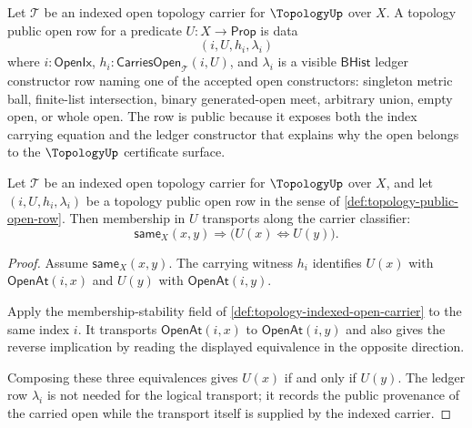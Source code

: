 \begin{definition}
\label{def:topology-public-open-row}
Let $\mathcal{T}$ be an indexed open topology carrier for $\TopologyUp$ over $X$. A topology public open row for a predicate $U:X\to\mathsf{Prop}$ is data
$$
(i,U,h_i,\lambda_i)
$$
where $i:\mathsf{OpenIx}$, $h_i:\mathsf{CarriesOpen}_{\mathcal{T}}(i,U)$, and $\lambda_i$ is a visible $\mathsf{BHist}$ ledger constructor row naming one of the accepted open constructors: singleton metric ball, finite-list intersection, binary generated-open meet, arbitrary union, empty open, or whole open. The row is public because it exposes both the index carrying equation and the ledger constructor that explains why the open belongs to the $\TopologyUp$ certificate surface.
\end{definition}

\begin{theorem}
\label{thm:topology-public-open-row-classifier-transport}
Let $\mathcal{T}$ be an indexed open topology carrier for $\TopologyUp$ over $X$, and let $(i,U,h_i,\lambda_i)$ be a topology public open row in the sense of \autoref{def:topology-public-open-row}. Then membership in $U$ transports along the carrier classifier:
$$
\mathsf{same}_X(x,y)
\Longrightarrow
\bigl(U(x)\Longleftrightarrow U(y)\bigr).
$$
\end{theorem}
\begin{proof}
Assume $\mathsf{same}_X(x,y)$. The carrying witness $h_i$ identifies $U(x)$ with $\mathsf{OpenAt}(i,x)$ and $U(y)$ with $\mathsf{OpenAt}(i,y)$.

Apply the membership-stability field of \autoref{def:topology-indexed-open-carrier} to the same index $i$. It transports $\mathsf{OpenAt}(i,x)$ to $\mathsf{OpenAt}(i,y)$ and also gives the reverse implication by reading the displayed equivalence in the opposite direction.

Composing these three equivalences gives $U(x)$ if and only if $U(y)$. The ledger row $\lambda_i$ is not needed for the logical transport; it records the public provenance of the carried open while the transport itself is supplied by the indexed carrier.
\end{proof}

